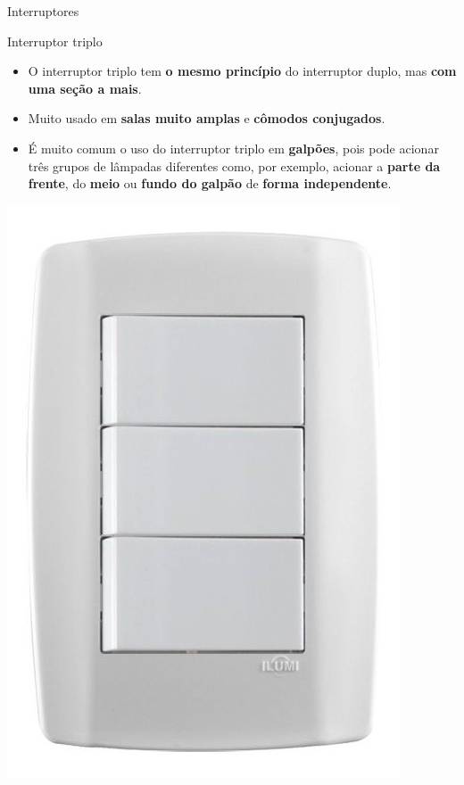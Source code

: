 \begin{frame}{Interruptores}
	\begin{block}{Interruptor triplo}
		\begin{itemize}
			\item O interruptor triplo tem \textbf{o mesmo princípio} do interruptor duplo, mas \textbf{com uma seção a mais}.
			\item Muito usado em \textbf{salas muito amplas} e \textbf{cômodos conjugados}.
			\item É muito comum o uso do interruptor triplo em \textbf{galpões}, pois pode acionar três grupos de lâmpadas diferentes como, por exemplo, acionar a \textbf{parte da frente}, do \textbf{meio} ou \textbf{fundo do galpão} de \textbf{forma independente}.
		\end{itemize}
	\end{block}

	\centering
	\includegraphics[height=0.4\textheight]{Figuras/Ch08/fig3}
\end{frame}


